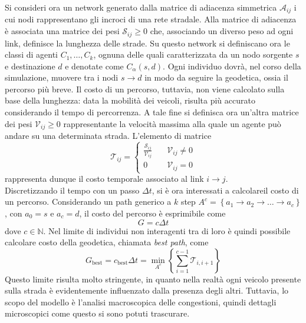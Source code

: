\documentclass[../main.tex]{subfiles}
\begin{document}
Si consideri ora un network generato dalla matrice di adiacenza simmetrica $\mathcal{A}_{ij}$ i cui nodi rappresentano gli incroci di una rete stradale.
Alla matrice di adiacenza \`e associata una matrice dei pesi $\mathcal{S}_{ij} \geq 0$ che, associando un diverso peso ad ogni link, definisce la lunghezza delle strade.
Su questo network si definiscano ora le classi di agenti $C_{1},\ldots,C_{k}$, ognuna delle quali caratterizzata da un nodo sorgente $s$ e destinazione $d$ e denotate come $C_{\alpha}(s,d)$.
Ogni individuo dovr\`a, nel corso della simulazione, muovere tra i nodi $s\to d$ in modo da seguire la geodetica, ossia il percorso pi\`u breve.
Il costo di un percorso, tuttavia, non viene calcolato sulla base della lunghezza: data la mobilit\`a dei veicoli, risulta pi\`u accurato considerando il tempo di percorrenza.
A tale fine si definisca ora un'altra matrice dei pesi $\mathcal{V}_{ij} \geq 0$ rappresentante la velocit\`a massima alla quale un agente pu\`o andare su una determinata strada.
L'elemento di matrice
\begin{equation}
    \mathcal{T}_{ij}=
    \begin{cases}
        \frac{\mathcal{S}_{ij}}{\mathcal{V}_{ij}} \quad& \mathcal{V}_{ij} \neq 0\\
        0 \quad& \mathcal{V}_{ij} = 0
    \end{cases}
\end{equation}
rappresenta dunque il costo temporale associato al link $i \to j$.\\
Discretizzando il tempo con un passo $\Delta t$, si \`e ora interessati a calcolareil costo di un percorso.
Considerando un path generico a $k$ step $A^{c} = \left\{a_{1} \to a_{2} \to \ldots \to a_{c}\right\}$, con $a_{0} = s$ e $a_{c} = d$, il costo del percorso \`e esprimibile come
\begin{equation}
    G=c\Delta t
\end{equation}
dove $c \in \mathbb{N}$.
Nel limite di individui non interagenti tra di loro \`e quindi possibile calcolare costo della geodetica, chiamata \emph{best path}, come
\begin{equation}
    G_{\text{best}} = c_{\text{best}}\Delta t = \min_{A^{c}} \left\{\sum_{i=1}^{c-1}\mathcal{T}_{i,i+1}\right\}
    \label{eq:best_path}
\end{equation}
Questo limite risulta molto stringente, in quanto nella realt\`a ogni veicolo presente sulla strada \`e evidentemente influenzato dalla presenza degli altri.
Tuttavia, lo scopo del modello \`e l'analisi macroscopica delle congestioni, quindi dettagli microscopici come questo si sono potuti trascurare.
\end{document}
